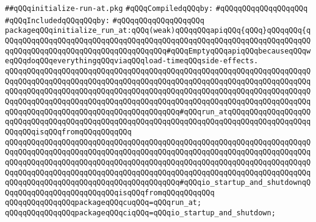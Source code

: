 \label{src/lib/src/lib/thread-kit/src/glue/initialize-run-at.pkg}
\verb|##qQQqinitialize-run-at.pkg|\newline
\newline
\verb|#qQQqCompiledqQQqby:|\newline
\verb|#qQQqqQQqqQQqqQQqqQQq|\newline
\newline
\verb|#qQQqIncludedqQQqqQQqby:|\newline
\verb|#qQQqqQQqqQQqqQQqqQQq|\newline
\newline
\verb|packageqQQqinitialize_run_at:qQQq(weak)qQQqqQQqapiqQQq{qQQq}qQQqqQQq{qQQqqQQqqQQqqQQqqQQqqQQqqQQqqQQqqQQqqQQqqQQqqQQqqQQqqQQqqQQqqQQqqQQqqQQqqQQqqQQqqQQqqQQqqQQqqQQqqQQqqQQqqQQq#qQQqEmptyqQQqapiqQQqbecauseqQQqweqQQqdoqQQqeverythingqQQqviaqQQqload-timeqQQqside-effects.|\newline
\newline
\verb|qQQqqQQqqQQqqQQqqQQqqQQqqQQqqQQqqQQqqQQqqQQqqQQqqQQqqQQqqQQqqQQqqQQqqQQqqQQqqQQqqQQqqQQqqQQqqQQqqQQqqQQqqQQqqQQqqQQqqQQqqQQqqQQqqQQqqQQqqQQqqQQqqQQqqQQqqQQqqQQqqQQqqQQqqQQqqQQqqQQqqQQqqQQqqQQqqQQqqQQqqQQqqQQqqQQqqQQqqQQqqQQqqQQqqQQqqQQqqQQqqQQqqQQqqQQqqQQqqQQqqQQqqQQqqQQqqQQqqQQqqQQqqQQqqQQqqQQqqQQqqQQqqQQqqQQqqQQqqQQq#qQQqrun_atqQQqqQQqqQQqqQQqqQQqqQQqqQQqqQQqqQQqqQQqqQQqqQQqqQQqqQQqqQQqqQQqqQQqqQQqqQQqqQQqqQQqqQQqqQQqqQQqisqQQqfromqQQqqQQqqQQq|\newline
\verb|qQQqqQQqqQQqqQQqqQQqqQQqqQQqqQQqqQQqqQQqqQQqqQQqqQQqqQQqqQQqqQQqqQQqqQQqqQQqqQQqqQQqqQQqqQQqqQQqqQQqqQQqqQQqqQQqqQQqqQQqqQQqqQQqqQQqqQQqqQQqqQQqqQQqqQQqqQQqqQQqqQQqqQQqqQQqqQQqqQQqqQQqqQQqqQQqqQQqqQQqqQQqqQQqqQQqqQQqqQQqqQQqqQQqqQQqqQQqqQQqqQQqqQQqqQQqqQQqqQQqqQQqqQQqqQQqqQQqqQQqqQQqqQQqqQQqqQQqqQQqqQQqqQQqqQQqqQQqqQQq#qQQqio_startup_and_shutdownqQQqqQQqqQQqqQQqqQQqqQQqqQQqisqQQqfromqQQqqQQqqQQq|\newline
\verb|qQQqqQQqqQQqqQQqpackageqQQqcuqQQq=qQQqrun_at;|\newline
\verb|qQQqqQQqqQQqqQQqpackageqQQqciqQQq=qQQqio_startup_and_shutdown;|\newline
